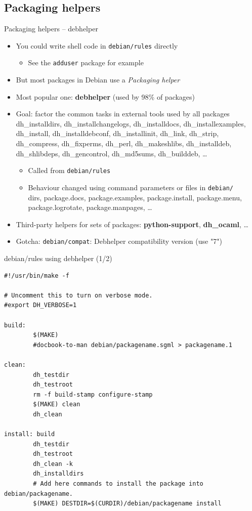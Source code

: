 \documentclass[10pt,final]{beamer}
\begin{document}
\subsection{Packaging helpers}
\begin{frame}{Packaging helpers -- debhelper}
\begin{itemize}
	\item You could write shell code in \texttt{debian/rules} directly
	\begin{itemize}
		\item See the \texttt{adduser} package for example
	\end{itemize}
	\hbr
	\item But most packages in Debian use a \textsl{Packaging helper}
	\hbr
	\item Most popular one: \textbf{debhelper} (used by 98\% of packages)
	\hbr
	\item Goal: factor the common tasks in external tools used by all packages\\
		{\footnotesize dh\_installdirs, dh\_installchangelogs, dh\_installdocs, dh\_installexamples, dh\_install, dh\_installdebconf, dh\_installinit, dh\_link, dh\_strip, dh\_compress, dh\_fixperms, dh\_perl, dh\_makeshlibs, dh\_installdeb, dh\_shlibdeps, dh\_gencontrol, dh\_md5sums, dh\_builddeb, \ldots}
		\begin{itemize}
			\item Called from \texttt{debian/rules}
			\item Behaviour changed using command parameters or files in \texttt{debian/}\\
				{\footnotesize \ttfamily dirs, package.docs, package.examples, package.install, package.menu, package.logrotate, package.manpages, \ldots}
		\end{itemize}
	\hbr
\item Third-party helpers for sets of packages: \textbf{python-support}, \textbf{dh\_ocaml}, \ldots
	\hbr
\item Gotcha: \texttt{debian/compat}: Debhelper compatibility version (use "7")
\end{itemize}
\end{frame}

\begin{frame}[fragile]{debian/rules using debhelper (1/2)}
\begin{lstlisting}[basicstyle=\ttfamily\footnotesize]
#!/usr/bin/make -f

# Uncomment this to turn on verbose mode.
#export DH_VERBOSE=1

build: 
        $(MAKE)
        #docbook-to-man debian/packagename.sgml > packagename.1

clean: 
        dh_testdir
        dh_testroot
        rm -f build-stamp configure-stamp
        $(MAKE) clean
        dh_clean 

install: build
        dh_testdir
        dh_testroot
        dh_clean -k 
        dh_installdirs
        # Add here commands to install the package into debian/packagename.
        $(MAKE) DESTDIR=$(CURDIR)/debian/packagename install
\end{lstlisting}
\end{frame}
\end{document}
